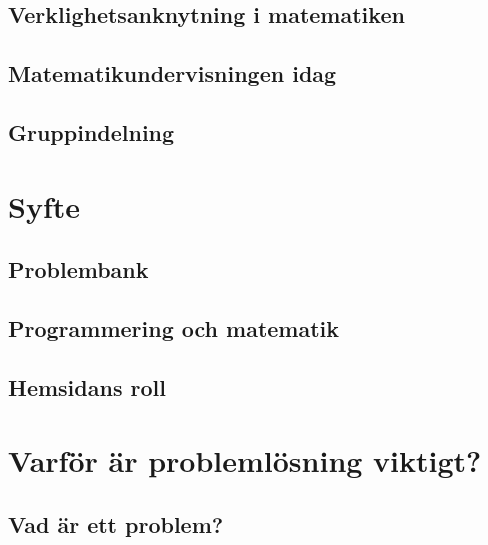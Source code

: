 \documentclass[11pt,a4paper]{article}
\begin{document}
    \subsection{Verklighetsanknytning i matematiken}
        \label{sec:Verklighetsanknytning}
        
        
    \subsection{Matematikundervisningen idag}
        
        
    \subsection{Gruppindelning}
        \label{sec:Gruppindelning}
        

\section{Syfte}
    
    
    \subsection{Problembank}
        
    
    \subsection{Programmering och matematik}
        \label{sec:ProgrammeringOchMatematik}
        
    
    \subsection{Hemsidans roll}
        

\section{Varför är problemlösning viktigt?}
    \label{sec:Teori}
    
    
    
    
    \subsection{Vad är ett problem?}
        \label{sec:problemdef}
        
        
\end{document}
